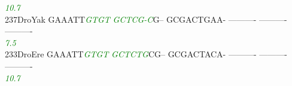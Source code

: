\documentclass[11pt,twoside,reqno,a4paper]{article}
\begin{document}
{\hspace*{4\charwidth}\hspace*{7\charwidth}\hspace*{6\charwidth}\textit{\textcolor{green}{10.7}}\hspace*{1\charwidth}\hspace*{1\charwidth}\hspace*{1\charwidth}\hspace*{1\charwidth}\hspace*{1\charwidth}\hspace*{1\charwidth}\\
237\hspace*{1\charwidth}DroYak	GAAATT\textit{\textcolor{green}{G}}\textit{\textcolor{green}{T}}\textit{\textcolor{green}{G}}\textit{\textcolor{green}{T}}	\textit{\textcolor{green}{G}}\textit{\textcolor{green}{C}}\textit{\textcolor{green}{T}}\textit{\textcolor{green}{C}}\textit{\textcolor{green}{G}}\textit{\textcolor{green}{-}}\textit{\textcolor{green}{C}}G--	GCGACTGAA-	----------	----------	----------	\\
\hspace*{4\charwidth}\hspace*{7\charwidth}\hspace*{6\charwidth}\textit{\textcolor{green}{7.5}}\hspace*{1\charwidth}\hspace*{1\charwidth}\hspace*{1\charwidth}\hspace*{1\charwidth}\hspace*{1\charwidth}\hspace*{1\charwidth}\\
233\hspace*{1\charwidth}DroEre	GAAATT\textit{\textcolor{green}{G}}\textit{\textcolor{green}{T}}\textit{\textcolor{green}{G}}\textit{\textcolor{green}{T}}	\textit{\textcolor{green}{G}}\textit{\textcolor{green}{C}}\textit{\textcolor{green}{T}}\textit{\textcolor{green}{C}}\textit{\textcolor{green}{T}}\textit{\textcolor{green}{G}}CG--	GCGACTACA-	----------	----------	----------	\\
\hspace*{4\charwidth}\hspace*{7\charwidth}\hspace*{6\charwidth}\textit{\textcolor{green}{10.7}}\hspace*{1\charwidth}\hspace*{1\charwidth}\hspace*{1\charwidth}\hspace*{1\charwidth}\hspace*{1\charwidth}\hspace*{1\charwidth}\\
}
\end{document}
